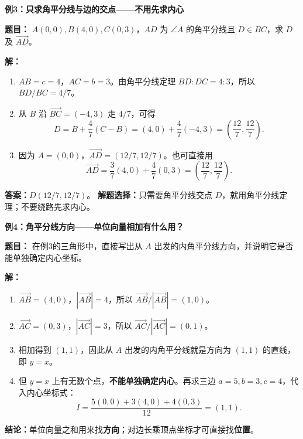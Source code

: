 \begin{examplebox}
\par\noindent\begin{minipage}{\linewidth}
\textbf{例3：只求角平分线与边的交点——不用先求内心}

\textbf{题目：} $A(0,0),B(4,0),C(0,3)$，$AD$ 为 $\angle A$ 的角平分线且 $D\in BC$，求 $D$ 及 $\vec{AD}$。

\end{minipage}\par
\textbf{解：}
\begin{enumerate}
\item $AB=c=4$，$AC=b=3$。由角平分线定理 $BD:DC=4:3$，所以 $BD/BC=4/7$。
\item 从 $B$ 沿 $\vec{BC}=(-4,3)$ 走 $4/7$，可得
\[
D=B+\frac47(C-B)=(4,0)+\frac47(-4,3)=\left(\frac{12}{7},\frac{12}{7}\right).
\]
\item 因为 $A=(0,0)$，$\vec{AD}=(12/7,12/7)$。也可直接用
\[
\vec{AD}=\frac37(4,0)+\frac47(0,3)=\left(\frac{12}{7},\frac{12}{7}\right).
\]
\end{enumerate}
\textbf{答案：}$\boxed{D(12/7,12/7)}$。
\textbf{解题选择：}只需要角平分线交点 $D$，就用角平分线定理；不要绕路先求内心。
\end{examplebox}

\begin{examplebox}
\par\noindent\begin{minipage}{\linewidth}
\textbf{例4：角平分线方向——单位向量相加有什么用？}

\textbf{题目：} 在例3的三角形中，直接写出从 $A$ 出发的内角平分线方向，并说明它是否能单独确定内心坐标。

\end{minipage}\par
\textbf{解：}
\begin{enumerate}
\item $\vec{AB}=(4,0)$，$|\vec{AB}|=4$，所以 $\vec{AB}/|\vec{AB}|=(1,0)$。
\item $\vec{AC}=(0,3)$，$|\vec{AC}|=3$，所以 $\vec{AC}/|\vec{AC}|=(0,1)$。
\item 相加得到 $(1,1)$，因此从 $A$ 出发的内角平分线就是方向为 $(1,1)$ 的直线，即 $y=x$。
\item 但 $y=x$ 上有无数个点，\textbf{不能单独确定内心}。再求三边 $a=5,b=3,c=4$，代入内心坐标式：
\[
I=\frac{5(0,0)+3(4,0)+4(0,3)}{12}=(1,1).
\]
\end{enumerate}
\textbf{结论：}单位向量之和用来找\textbf{方向}；对边长乘顶点坐标才可直接找\textbf{位置}。
\end{examplebox}

